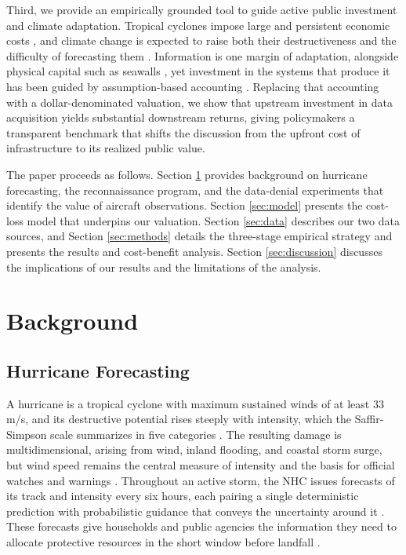 \documentclass[12pt]{article}%
\begin{document}
Third, we provide an empirically grounded tool to guide active public investment and climate adaptation. Tropical cyclones impose large and persistent economic costs \citep{hsiang2014causal, deryugina2017fiscal}, and climate change is expected to raise both their destructiveness \citep{mendelsohn2012impact, kossin2020global} and the difficulty of forecasting them \citep{emanuel2017will}. Information is one margin of adaptation, alongside physical capital such as seawalls \citep{fried2022seawalls}, yet investment in the systems that produce it has been guided by assumption-based accounting \citep{ANSER2016ExternalBenefits}. Replacing that accounting with a dollar-denominated valuation, we show that upstream investment in data acquisition yields substantial downstream returns, giving policymakers a transparent benchmark that shifts the discussion from the upfront cost of infrastructure to its realized public value.

The paper proceeds as follows. Section \ref{sec:background} provides background on hurricane forecasting, the reconnaissance program, and the data-denial experiments that identify the value of aircraft observations. Section \ref{sec:model} presents the cost-loss model that underpins our valuation. Section \ref{sec:data} describes our two data sources, and Section \ref{sec:methods} details the three-stage empirical strategy and presents the results and cost-benefit analysis. Section \ref{sec:discussion} discusses the implications of our results and the limitations of the analysis.

\section{Background} \label{sec:background}

\subsection{Hurricane Forecasting} \label{sec:forecasting}

A hurricane is a tropical cyclone with maximum sustained winds of at least 33 m/s, and its destructive potential rises steeply with intensity, which the Saffir-Simpson scale summarizes in five categories \citep{Emanuel2003}. The resulting damage is multidimensional, arising from wind, inland flooding, and coastal storm surge, but wind speed remains the central measure of intensity and the basis for official watches and warnings \citep{CBO2019, HilderbrandXie2025}. Throughout an active storm, the NHC issues forecasts of its track and intensity every six hours, each pairing a single deterministic prediction with probabilistic guidance that conveys the uncertainty around it \citep{RappaportEA2009, Broad2007}. These forecasts give households and public agencies the information they need to allocate protective resources in the short window before landfall \citep{molina2024social}.
\end{document}
